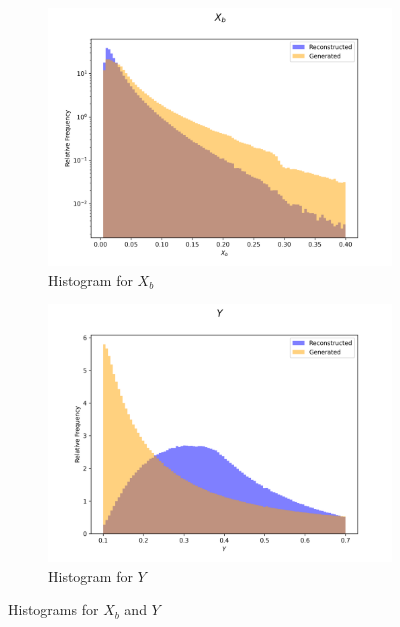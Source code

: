 \documentclass{article}
\begin{document}
\begin{figure}[H]
    \centering
    \begin{subfigure}[b]{0.45\textwidth}
        \includegraphics[width=\textwidth]{graphs/hadr_X_b.png}
        \caption{Histogram for $X_b$}
        \label{fig:had_X_b}
    \end{subfigure}
    \hfill
    \begin{subfigure}[b]{0.45\textwidth}
        \includegraphics[width=\textwidth]{graphs/hadr_Y.png}
        \caption{Histogram for $Y$}
        \label{fig:had_Y}
    \end{subfigure}
    \caption{Histograms for $X_b$ and $Y$}
\end{figure}
\end{document}
